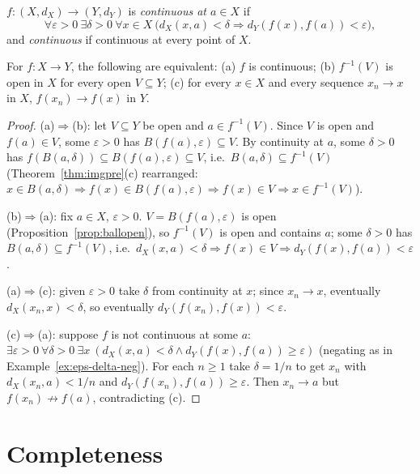 \begin{definition}[Continuity]
	$f:(X,d_X)\to(Y,d_Y)$ is \emph{continuous at $a\in X$} if
	\[
	\forall\varepsilon>0\ \exists\delta>0\ \forall x\in X\ \bigl(d_X(x,a)<\delta\Rightarrow d_Y(f(x),f(a))<\varepsilon\bigr),
	\]
	and \emph{continuous} if continuous at every point of $X$.
\end{definition}

\begin{theorem}\label{thm:contchar}
	For $f:X\to Y$, the following are equivalent: (a) $f$ is continuous; (b) $f^{-1}(V)$ is open in $X$ for every open $V\subseteq Y$; (c) for every $x\in X$ and every sequence $x_n\to x$ in $X$, $f(x_n)\to f(x)$ in $Y$.
\end{theorem}
\begin{proof}
	(a)$\Rightarrow$(b): let $V\subseteq Y$ be open and $a\in f^{-1}(V)$. Since $V$ is open and $f(a)\in V$, some $\varepsilon>0$ has $B(f(a),\varepsilon)\subseteq V$. By continuity at $a$, some $\delta>0$ has $f(B(a,\delta))\subseteq B(f(a),\varepsilon)\subseteq V$, i.e.\ $B(a,\delta)\subseteq f^{-1}(V)$ (Theorem~\ref{thm:imgpre}(c) rearranged: $x\in B(a,\delta)\Rightarrow f(x)\in B(f(a),\varepsilon)\Rightarrow f(x)\in V\Rightarrow x\in f^{-1}(V)$).
	
	(b)$\Rightarrow$(a): fix $a\in X$, $\varepsilon>0$. $V=B(f(a),\varepsilon)$ is open (Proposition~\ref{prop:ballopen}), so $f^{-1}(V)$ is open and contains $a$; some $\delta>0$ has $B(a,\delta)\subseteq f^{-1}(V)$, i.e.\ $d_X(x,a)<\delta\Rightarrow f(x)\in V\Rightarrow d_Y(f(x),f(a))<\varepsilon$.
	
	(a)$\Rightarrow$(c): given $\varepsilon>0$ take $\delta$ from continuity at $x$; since $x_n\to x$, eventually $d_X(x_n,x)<\delta$, so eventually $d_Y(f(x_n),f(x))<\varepsilon$.
	
	(c)$\Rightarrow$(a): suppose $f$ is not continuous at some $a$: $\exists\varepsilon>0\ \forall\delta>0\ \exists x\ (d_X(x,a)<\delta\wedge d_Y(f(x),f(a))\ge\varepsilon)$ (negating as in Example~\ref{ex:eps-delta-neg}). For each $n\ge1$ take $\delta=1/n$ to get $x_n$ with $d_X(x_n,a)<1/n$ and $d_Y(f(x_n),f(a))\ge\varepsilon$. Then $x_n\to a$ but $f(x_n)\not\to f(a)$, contradicting (c).
\end{proof}

\section{Completeness}

